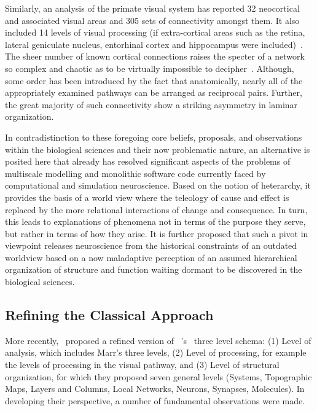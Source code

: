 \documentclass[11pt,3p,twocolumn]{JMN}
\begin{document}
Similarly, an analysis of the primate visual system has reported 32 neocortical and associated visual areas and 305 sets of connectivity amongst them. It also included 14 levels of visual processing (if extra-cortical areas such as the retina, lateral geniculate nucleus, entorhinal cortex and hippocampus were included)~\citep[see Fig.\,4][]{felleman91}. The sheer number of known cortical connections raises the specter of a network so complex and chaotic as to be virtually impossible to decipher~\citep{vanessen93}. Although, some order has been introduced by the fact that anatomically, nearly all of the appropriately examined pathways can be arranged as reciprocal pairs. Further, the great majority of such connectivity show a striking asymmetry in laminar organization. 

In contradistinction to these foregoing core beliefs, proposals, and observations within the biological sciences and their now problematic nature, an alternative is posited here that already has resolved significant aspects of the problems of  multiscale modelling and monolithic software code currently faced by computational and simulation neuroscience. Based on the notion of heterarchy, it provides the basis of a world view where the teleology of cause and effect is replaced by the more relational interactions of change and consequence. In turn, this leads to explanations of phenomena not in terms of the purpose they serve, but rather in terms of how they arise. It is further proposed that such a pivot in viewpoint releases neuroscience from the historical constraints of an outdated worldview based on a now maladaptive perception of an assumed hierarchical organization of structure and function waiting dormant to be discovered in the biological sciences.

\subsection{Refining the Classical Approach}

More recently,~\citet[][C\&S]{Churchland:1992uq} proposed a refined version of ~\citeauthor{Marr:1982fk}'s~\citeyear{Marr:1982fk} three level schema: (1) Level of analysis, which includes Marr’s three levels, (2) Level of processing, for example the levels of processing in the visual pathway, and (3) Level of structural organization, for which they proposed seven general levels (Systems, Topographic Maps, Layers and Columns, Local Networks, Neurons, Synapses, Molecules). In developing their perspective, a number of fundamental observations were made.
\end{document}
